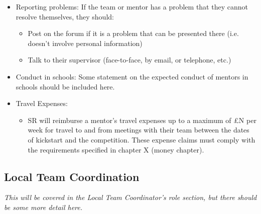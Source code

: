 \begin{itemize}
\item Reporting problems:  If the team or mentor has a problem that they cannot resolve themselves, they should:
  \begin{itemize}
  \item Post on the forum if it is a problem that can be presented there (i.e. doesn't involve personal information)
  \item Talk to their supervisor (face-to-face, by email, or telephone, etc.)
  \end{itemize}

\item Conduct in schools: Some statement on the expected conduct of mentors in schools should be included here.

\item Travel Expenses:
  \begin{itemize}
  \item SR will reimburse a mentor's travel expenses up to a maximum of {\pounds}N per week for travel to and from meetings with their team between the dates of kickstart and the competition.  These expense claims must comply with the requirements specified in chapter X (money chapter).
  \end{itemize}

\end{itemize}

\subsection{Local Team Coordination}

\textit{This will be covered in the Local Team Coordinator's role section, but there should be some more detail here.}

